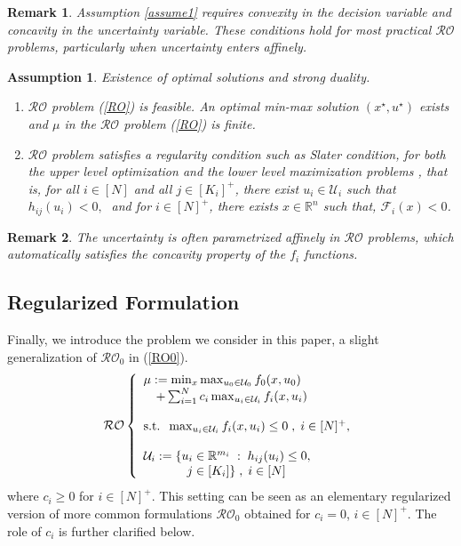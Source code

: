 \documentclass[journal,twoside,web]{ieeecolor}
\newcommand{\rev}[1]{#1}
\newtheorem{assumption}[theorem]{Assumption}
\newtheorem{remark}{Remark}
\begin{document}
\begin{remark}
Assumption \ref{assume1} requires convexity in the decision variable and concavity in the uncertainty variable. These conditions hold for most practical $\mathcal{RO}$ problems, particularly when uncertainty enters affinely.
\end{remark}

\begin{assumption} \label{assume_feasible} Existence of optimal solutions and strong duality.

\begin{enumerate}
\item $\mathcal{RO}$ problem (\ref{RO}) is feasible. An optimal min-max solution $(x^\star,u^\star)$ exists and $\mu$ in the $\mathcal{RO}$ problem (\ref{RO}) is finite.
\item $\mathcal{RO}$ problem satisfies \rev{a regularity condition such as Slater condition}, for both the upper level optimization and the lower level maximization problems
\cite{bental2009-2}, that is,
for all $i\in[N]$ and all $j\in[K_i]^+$, there exist $u_i \in \mathcal{U}_i$ such that $h_{ij}(u_i)<0,\;$  and
for $i\in[N]^+$,  there exists $x \in \mathbb{R}^n$ such that, $\mathcal{F}_i(x)<0$\;.
\end{enumerate}
\end{assumption}
\begin{remark}
The uncertainty is often parametrized affinely in $\mathcal{RO}$ problems, which automatically satisfies the concavity property of the $f_i$ functions.
\end{remark}

\subsection*{Regularized Formulation}

Finally, we introduce the problem we consider in this paper, a slight generalization of $\mathcal{RO}_0$ in (\ref{RO0}).
\begin{equation}\mathcal{RO}\left\{\begin{array}{l}
\mu:=\min_{x} \max_{u_0\in \mathcal{U}_0} f_0(x,u_0)\\
\quad +\sum_{i=1}^N c_i \max_{u_i\in \mathcal{U}_i} f_i(x,u_i)\label{RO}\\ \\
\text{s.t.}\;\;\max_{u_i\in \mathcal{U}_i} f_i(x,u_i)\leq 0\;,\;i\in[N]^+,\\ \\
\mathcal{U}_i:=\{u_i\in \mathbb{R}^{m_i}\;:\;h_{ij}(u_i)\leq 0,\\
\hspace{3.5em} j\in[K_i]\}\;,\;i\in[N]
\end{array}\right.
\end{equation}
where $c_i\geq 0$ for $i\in[N]^+$. This setting can be seen as an elementary regularized version of more common formulations $\mathcal{RO}_0$ obtained for $c_i=0$, $i\in[N]^+$.
The role of $c_i$ is further clarified below.
\end{document}
